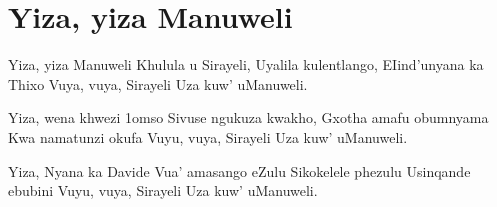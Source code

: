 \starttocol
\chapter{Yiza, yiza Manuweli}
\nexttocol
\hfill{\it }
\stoptocol
\starttocol
\startlines
{\sc Yiza}, yiza Manuweli
Khulula u Sirayeli,
Uyalila kulentlango,
EIind'unyana ka Thixo
Vuya, vuya, Sirayeli
Uza kuw' uManuweli.
 
Yiza, wena khwezi 1omso
Sivuse ngukuza kwakho,
Gxotha amafu obumnyama
Kwa namatunzi okufa
Vuyu, vuya, Sirayeli
Uza kuw' uManuweli.

Yiza, Nyana ka Davide
Vua' amasango eZulu
Sikokelele phezulu
Usinqande ebubini
Vuyu, vuya, Sirayeli
Uza kuw' uManuweli.

\stoplines
\nexttocol

\stoptocol
